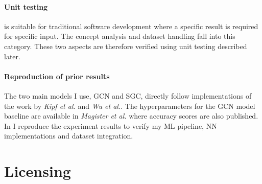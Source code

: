 \paragraph{Unit testing}
is suitable for traditional software development where a specific result is required for specific input.
The concept analysis and dataset handling fall into this category.
These two aspects are therefore verified using unit testing described later. 

\paragraph{Reproduction of prior results}
The two main models I use, GCN and SGC, directly follow implementations of the work by \textit{Kipf et al.}\cite{kipf2016semi} and \textit{Wu et al.}\cite{wu2019simplifying}. The hyperparameters for the GCN model baseline are available in \textit{Magister et al.}\cite{magister2021gcexplainer} where accuracy scores are also published. In  I reproduce the experiment results to verify my ML pipeline, NN implementations and dataset integration.

\section{Licensing}



